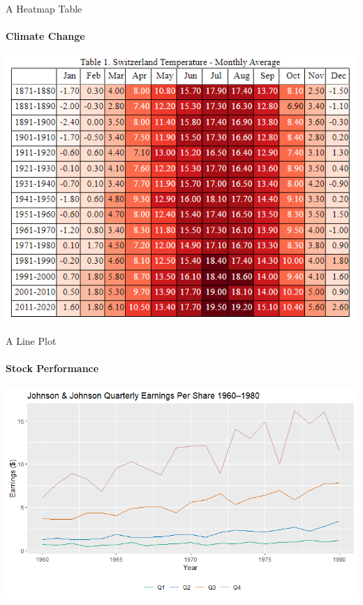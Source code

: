 \documentclass[10pt]{beamer}
\begin{document}
\begin{frame}{A Heatmap Table}
    \framesubtitle{Climate Change}
    \begin{minipage}{\textwidth}
        \centering
        \includegraphics[scale=0.55]{heatmap.png}
    \end{minipage} 
\end{frame}


\begin{frame}{A Line Plot}
    \framesubtitle{Stock Performance}
    \begin{minipage}{\textwidth}
        \centering
        \includegraphics[scale=0.55]{lineplot.png}
    \end{minipage} 
\end{frame}
\end{document}
